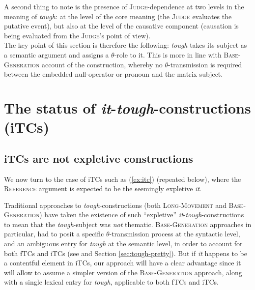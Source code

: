 \documentclass[11pt]{article}
\begin{document}
A second thing to note is the presence of \textsc{Judge}-dependence at two levels in the meaning of \textit{tough}: at the level of the core meaning (the \textsc{Judge} evaluates the putative event), but also at the level of the causative component (causation is being evaluated from the \textsc{Judge}'s point of view).\\

The key point of this section is therefore the following: \textit{tough} takes its subject as a semantic argument and assigns a $\theta$-role to it. This is more in line with \textsc{Base-Generation} account of the construction, whereby no $\theta$-transmission is required between the embedded null-operator or pronoun and the matrix subject. 



\section{The status of \textit{it}-\textit{tough}-constructions (iTCs)}\label{sec:it-not-expletive}
\subsection{iTCs are not expletive constructions}
We now turn to the case of iTCs such as (\ref{ex:itc}) (repeated below), where the \textsc{Reference} argument is expected to be the seemingly expletive \textit{it}.
\begin{exe}
\end{exe}

Traditional approaches to \textit{tough}-constructions (both \textsc{Long-Movement} and \textsc{Base-Generation}) have taken the existence of such ``expletive'' \textit{it}-\textit{tough}-constructions to mean that the \textit{tough}-subject was \textit{not} thematic. \textsc{Base-Generation} approaches in particular, had to posit a specific $\theta$-transmission process at the syntactic level, and an ambiguous entry for \textit{tough} at the semantic level, in order to account for both fTCs and iTCs (see \cite{Keine2017} and Section \ref{sec:tough-pretty}). But if \textit{it} happens to be a contentful element in iTCs, our approach will have a clear advantage since it will allow to assume a simpler version of the \textsc{Base-Generation} approach, along with a single lexical entry for \textit{tough}, applicable to both fTCs and iTCs.\\
\end{document}
